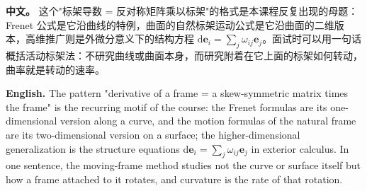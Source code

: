 \documentclass[UTF8,11pt,a4paper]{ctexart}
\newcommand{\APS}[2]{\par\noindent\textbf{中文。} #1\par\noindent\textbf{English.} #2\par\smallskip}
\newcommand{\dd}{\mathrm{d}}
\newcommand{\be}{\mathbf{e}}
\begin{document}
\APS{这个"标架导数 = 反对称矩阵乘以标架"的格式是本课程反复出现的母题：Frenet 公式是它沿曲线的特例，曲面的自然标架运动公式是它沿曲面的二维版本，高维推广则是外微分意义下的结构方程 $\dd\be_i=\sum_j\omega_{ij}\be_j$。面试时可以用一句话概括活动标架法：不研究曲线或曲面本身，而研究附着在它上面的标架如何转动，曲率就是转动的速率。}{The pattern "derivative of a frame = a skew-symmetric matrix times the frame" is the recurring motif of the course: the Frenet formulas are its one-dimensional version along a curve, and the motion formulas of the natural frame are its two-dimensional version on a surface; the higher-dimensional generalization is the structure equations $\dd\be_i=\sum_j\omega_{ij}\be_j$ in exterior calculus. In one sentence, the moving-frame method studies not the curve or surface itself but how a frame attached to it rotates, and curvature is the rate of that rotation.}
\end{document}
